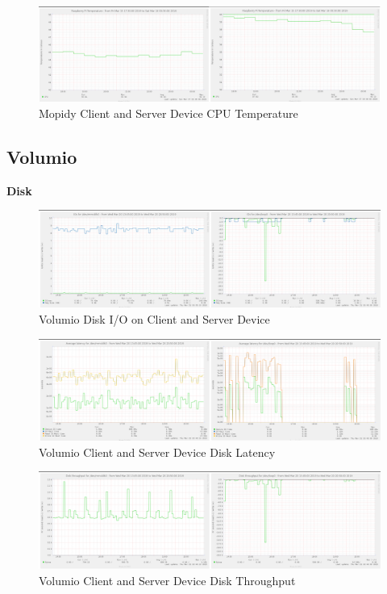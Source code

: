 \documentclass[11pt,a4paper,headinclude=false,footinclude=false]{scrreprt}
\begin{document}
\begin{figure}[H]
\includegraphics{ResultsAndAnalysis/MopidyServerTestImages/003MopidyCPUTemp.png}
\centering
\caption{Mopidy Client and Server Device CPU Temperature}
\label{MopidyCPUTemp}
\end{figure}

\subsection{Volumio}\label{volumio-2}

\textbf{Disk}

\begin{figure}[H]
\includegraphics{ResultsAndAnalysis/VolumioServerTestImages/005VolumioDiskIO.png}
\centering
\caption{Volumio Disk I/O on Client and Server Device}
\label{VolumioDiskIO}
\end{figure}

\begin{figure}[H]
\includegraphics{ResultsAndAnalysis/VolumioServerTestImages/006VolumioDiskLatency.png}
\centering
\caption{Volumio Client and Server Device Disk Latency}
\label{VolumioDiskLatency}
\end{figure}

\begin{figure}[H]
\includegraphics{ResultsAndAnalysis/VolumioServerTestImages/007VolumioDiskThroughput.png}
\centering
\caption{Volumio Client and Server Device Disk Throughput}
\label{VolumioDiskThroughput}
\end{figure}
\end{document}
